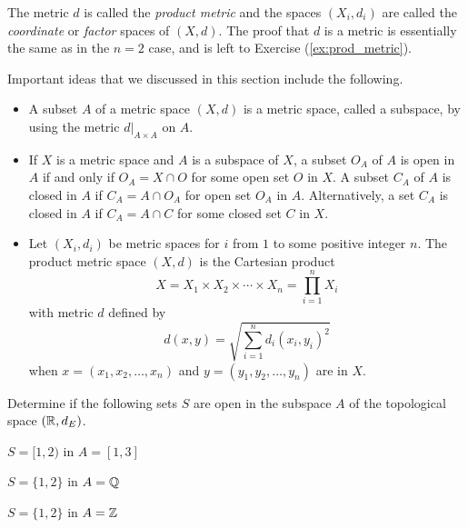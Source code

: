 The metric $d$ is called the \emph{product metric} and the spaces $(X_i,d_i)$ are called the \emph{coordinate} or \emph{factor} spaces of $(X,d)$. The proof that $d$ is a metric is essentially the same as in the $n=2$ case, and is left to Exercise (\ref{ex:prod_metric}). 

\label{sec_sub_metric_summ}
Important ideas that we discussed in this section include the following.
\begin{itemize}
\item A subset $A$ of a metric space $(X,d)$ is a metric space, called a subspace, by using the metric $d|_{A \times A}$ on $A$. 
\item If $X$ is a metric space and $A$ is a subspace of $X$, a subset $O_A$ of $A$ is open in $A$ if and only if $O_A = X \cap O$ for some open set $O$ in $X$. A subset $C_A$ of $A$ is closed in $A$ if $C_A = A \cap O_A$ for open set $O_A$ in $A$. Alternatively, a set $C_A$ is closed in $A$ if $C_A = A \cap C$ for some closed set $C$ in $X$.
\item Let $(X_i, d_i)$ be metric spaces for $i$ from $1$ to some positive integer $n$. The product metric space $(X,d)$ is the Cartesian product
\[X = X_1 \times X_2 \times \cdots \times X_n = \prod_{i=1}^n X_i\]
with metric $d$ defined by 
\[d(x,y) = \sqrt{\sum_{i=1}^n d_i(x_i,y_i)^2}\]
when $x = (x_1, x_2, \ldots, x_n)$ and $y = (y_1, y_2, \ldots, y_n)$ are in $X$.
\end{itemize}

\label{sec_sub_metric_exer}

\be

\item Determine if the following sets $S$ are open in the subspace $A$ of the topological space $(\mathbb{R}, d_E)$.

\ba

\item $S = [1,2)$ in $A = [1,3]$

\item $S = \{1, 2\}$ in $A = \mathbb{Q}$

\item $S = \{1,2\}$ in $A = \mathbb{Z}$

\ea

\begin{comment}

\ExerciseSolution

\ba

\item Since $S = A \cap (0,2)$, it follows that $S$ is open in $A$. 

\item Any open set in $\R$ that contains 1 also contains $B(1,r)$ for some $r > 0$. But this open ball contains points in $\Q$ that are not in $S$. We conclude that $S$ is not open in $A$. 

\item Since $S = \Z \cap (0,1.5) \cup (1.5,2.5)$, we conclude that $S$ is open in $A$.

\ea


\end{comment}

